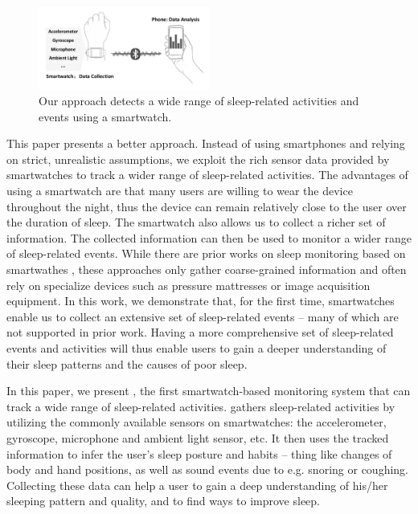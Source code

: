 \begin{figure}[!t]
\centering
\setlength{\belowcaptionskip}{-13pt}
      \includegraphics[width=0.5\textwidth]{Figures/datacollect.pdf}
  \caption{Our approach detects a wide range of sleep-related activities and events using a smartwatch.}\label{fig:datacollect}
\end{figure}

This paper presents a better approach. Instead of using smartphones and relying on strict, unrealistic assumptions, we exploit the rich
sensor data provided by smartwatches to track a wider range of sleep-related activities. The advantages of using a smartwatch are that
many users are willing to wear the device throughout the night, thus the device can remain relatively close to the user over the duration
of sleep.  The smartwatch also allows us to collect a richer set of information. The collected information can then be used to monitor a
wider range of sleep-related events. While there are prior works on sleep monitoring based on smartwathes
\cite{pombo2016ubisleep,shelgikar2016sleep,haescher2015anomaly,borazio2012combining}, these approaches only gather coarse-grained
information and often rely on specialize devices such as pressure mattresses or image acquisition equipment. In this work, we demonstrate
that, for the first time, smartwatches enable us to collect an extensive set of sleep-related events -- many of which are not supported in
prior work. Having a more comprehensive set of sleep-related events and activities will thus enable users to gain a deeper understanding of
their sleep patterns and the causes of poor sleep.



In this paper, we present \systemname, the first smartwatch-based monitoring system that can track a wide range of sleep-related
activities. \systemname gathers sleep-related activities by utilizing the commonly available sensors on smartwatches: the accelerometer,
gyroscope, microphone and ambient light sensor, etc. It then uses the tracked information to infer the user's sleep posture and habits --
thing like changes of body and hand positions, as well as sound events due to e.g. snoring or coughing.  Collecting these data can help a
user to gain a deep understanding of his/her sleeping pattern and quality, and to find ways to improve sleep.

